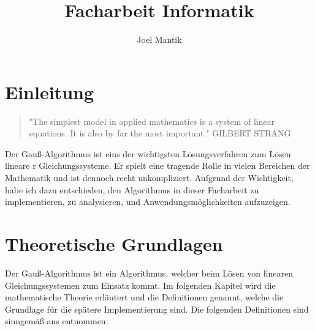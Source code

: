 \documentclass[a4paper, 12pt]{report}
\title{Facharbeit Informatik}
\author{Joel Mantik}
\begin{document}
\maketitle
\begin{sloppypar}
\tableofcontents

\chapter{Einleitung}
\begin{quote}
    "The simplest model in applied mathematics is a system of linear equations. It is also by far the most important."
    \newline GILBERT STRANG
\end{quote}
Der Gauß-Algorithmus ist eins der wichtigsten Lösungsverfahren zum Lösen lineare
r Gleichungssysteme.
Er spielt eine tragende Rolle in vielen Bereichen der Mathematik und ist dennoch  recht unkompliziert.
    Aufgrund der Wichtigkeit, habe ich dazu entschieden, den Algorithmus in dieser
Facharbeit zu implementieren,
zu analysieren, und Anwendungsmöglichkeiten aufzuzeigen.

\chapter{Theoretische Grundlagen}
Der Gauß-Algorithmus ist ein Algorithmus, welcher beim Lösen von linearen Gleichungssystemen zum Einsatz kommt. Im folgenden Kapitel wird die mathematische
Theorie erläutert und die Definitionen genannt, welche die Grundlage für die spätere Implementierung sind.
Die folgenden Definitionen sind sinngemäß aus \cite{gramlich2021} entnommen.

\end{sloppypar}
\end{document}
